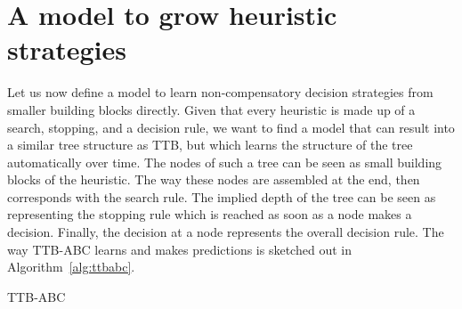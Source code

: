 \documentclass[a4paper,man, natbib]{apa6}
\begin{document}
\section{A model to grow heuristic strategies}
Let us now define a model to learn non-compensatory decision strategies from smaller building blocks directly. Given that every heuristic is made up of a search, stopping, and a decision rule, we want to find a model that can result into a similar tree structure as TTB, but which learns the structure of the tree automatically over time. The nodes of such a tree can be seen as small building blocks of the heuristic.  The way these nodes are assembled at the end, then corresponds with the search rule. The implied depth of the tree can be seen as representing the stopping rule which is reached as soon as a node makes a decision. Finally, the decision at a node represents the overall decision rule. The way TTB-ABC learns and makes predictions is sketched out in Algorithm~\ref{alg:ttbabc}.\\

\FloatBarrier
\begin{algorithm}
\caption{TTB-ABC}
\label{alg:ttbabc}

\end{algorithm}
\FloatBarrier
\end{document}
